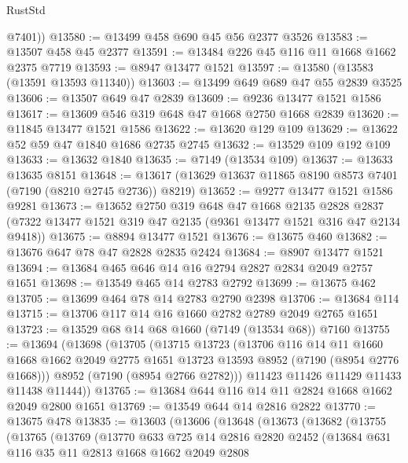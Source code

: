 \begin{lexlean}{RustStd}
\begin{coremodule}
        @7401))
@13580 := @13499 @458 @690 @45 @56 @2377 @3526
@13583 := @13507 @458 @45 @2377
@13591 := @13484 @226 @45 @116 @11 @1668 @1662 @2375 @7719
@13593 := @8947 @13477 @1521
@13597 := @13580 (@13583 (@13591 @13593 @11340))
@13603 := @13499 @649 @689 @47 @55 @2839 @3525
@13606 := @13507 @649 @47 @2839
@13609 := @9236 @13477 @1521 @1586
@13617 := @13609 @546 @319 @648 @47 @1668 @2750 @1668 @2839
@13620 := @11845 @13477 @1521 @1586
@13622 := @13620 @129 @109
@13629 := @13622 @52 @59 @47 @1840 @1686 @2735 @2745
@13632 := @13529 @109 @192 @109
@13633 := @13632 @1840
@13635 := @7149 (@13534 @109)
@13637 := @13633 @13635 @8151
@13648 := @13617 (@13629 @13637 @11865 @8190 @8573 @7401 (@7190 (@8210 @2745 @2736)) @8219)
@13652 := @9277 @13477 @1521 @1586 @9281
@13673 := @13652
    @2750
    @319
    @648
    @47
    @1668
    @2135
    @2828
    @2837
    (@7322 @13477 @1521 @319 @47 @2135 (@9361 @13477 @1521 @316 @47 @2134 @9418))
@13675 := @8894 @13477 @1521
@13676 := @13675 @460
@13682 := @13676 @647 @78 @47 @2828 @2835 @2424
@13684 := @8907 @13477 @1521
@13694 := @13684 @465 @646 @14 @16 @2794 @2827 @2834 @2049 @2757 @1651
@13698 := @13549 @465 @14 @2783 @2792
@13699 := @13675 @462
@13705 := @13699 @464 @78 @14 @2783 @2790 @2398
@13706 := @13684 @114
@13715 := @13706 @117 @14 @16 @1660 @2782 @2789 @2049 @2765 @1651
@13723 := @13529 @68 @14 @68 @1660 (@7149 (@13534 @68)) @7160
@13755 := @13694
    (@13698
      (@13705
        (@13715
          @13723
          (@13706
            @116
            @14
            @11
            @1660
            @1668
            @1662
            @2049
            @2775
            @1651
            @13723
            @13593
            @8952
            (@7190 (@8954 @2776 @1668)))
          @8952
          (@7190 (@8954 @2766 @2782)))
        @11423
        @11426
        @11429
        @11433
        @11438
        @11444))
@13765 := @13684 @644 @116 @14 @11 @2824 @1668 @1662 @2049 @2800 @1651
@13769 := @13549 @644 @14 @2816 @2822
@13770 := @13675 @478
@13835 := @13603
    (@13606
      (@13648
        (@13673
          (@13682
            (@13755
              (@13765
                (@13769
                  (@13770
                    @633
                    @725
                    @14
                    @2816
                    @2820
                    @2452
                    (@13684
                      @631
                      @116
                      @35
                      @11
                      @2813
                      @1668
                      @1662
                      @2049
                      @2808

\end{coremodule}
\end{lexlean}
